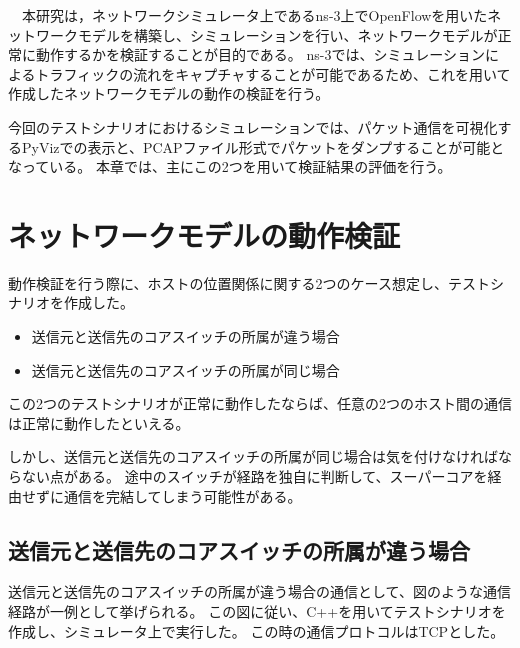 \begin{comment}
\end{comment}

　本研究は，ネットワークシミュレータ上であるns-3上でOpenFlowを用いたネットワークモデルを構築し、シミュレーションを行い、ネットワークモデルが正常に動作するかを検証することが目的である。
ns-3では、シミュレーションによるトラフィックの流れをキャプチャすることが可能であるため、これを用いて作成したネットワークモデルの動作の検証を行う。

今回のテストシナリオにおけるシミュレーションでは、パケット通信を可視化するPyVizでの表示と、PCAPファイル形式でパケットをダンプすることが可能となっている。
本章では、主にこの2つを用いて検証結果の評価を行う。

\section{ネットワークモデルの動作検証}

動作検証を行う際に、ホストの位置関係に関する2つのケース想定し、テストシナリオを作成した。

\begin{itemize}
	\item 送信元と送信先のコアスイッチの所属が違う場合
	\item 送信元と送信先のコアスイッチの所属が同じ場合
\end{itemize}

この2つのテストシナリオが正常に動作したならば、任意の2つのホスト間の通信は正常に動作したといえる。

しかし、送信元と送信先のコアスイッチの所属が同じ場合は気を付けなければならない点がある。
途中のスイッチが経路を独自に判断して、スーパーコアを経由せずに通信を完結してしまう可能性がある。


\subsection{送信元と送信先のコアスイッチの所属が違う場合}

送信元と送信先のコアスイッチの所属が違う場合の通信として、図のような通信経路が一例として挙げられる。
この図に従い、C++を用いてテストシナリオを作成し、シミュレータ上で実行した。
この時の通信プロトコルはTCPとした。

